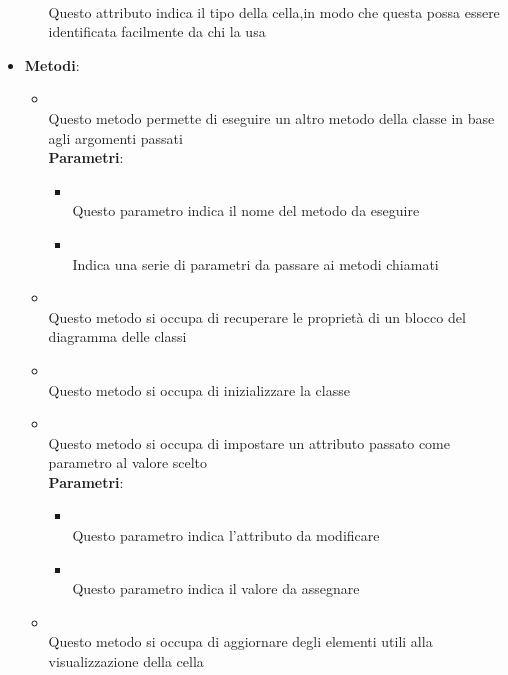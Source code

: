 \begin{itemize}
\begin{itemize}
\\ Questo attributo indica il tipo della cella,in modo che questa possa essere identificata facilmente da chi la usa
\end{itemize}
\item \textbf{Metodi}:
\begin{itemize}
\item {}
\\ Questo metodo permette di eseguire un altro metodo della classe in base agli argomenti passati
\\ \textbf{Parametri}:
\begin{itemize}
\item {}
\\ Questo parametro indica il nome del metodo da eseguire
\item {}
\\ Indica una serie di parametri da passare ai metodi chiamati
\end{itemize}
\item {}
\\ Questo metodo si occupa di recuperare le proprietà di un blocco del diagramma delle classi
\item {}
\\ Questo metodo si occupa di inizializzare la classe
\item {}
\\ Questo metodo si occupa di impostare un attributo passato come parametro al valore scelto
\\ \textbf{Parametri}:
\begin{itemize}
\item {}
\\ Questo parametro indica l'attributo da modificare
\item {}
\\ Questo parametro indica il valore da assegnare
\end{itemize}
\item {}
\\ Questo metodo si occupa di aggiornare degli elementi utili alla visualizzazione della cella
\end{itemize}
\end{itemize}

